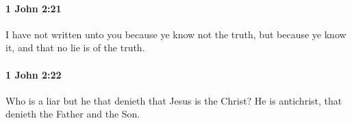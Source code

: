 		\paragraph{1 John 2:21} %
			\label{1JOHN-2-21}

			I have not written unto you because ye know not the truth, but because ye know it, and that no lie is of the truth.

			\begin{framed}
			\scriptsize
				\begin{compactdesc}
					\item[SBLG] 
				\end{compactdesc}
			\end{framed}

		\paragraph{1 John 2:22} %
			\label{1JOHN-2-22}

			Who is a liar but he that denieth that Jesus is the Christ?  He is antichrist, that denieth the Father and the Son.

